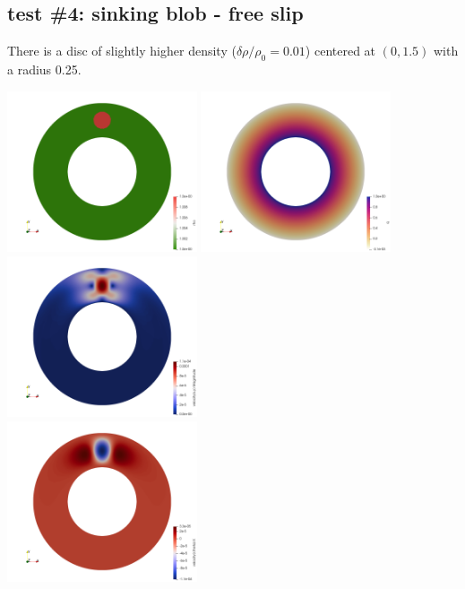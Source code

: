 \subsection*{test \#4: sinking blob - free slip}

There is a disc of slightly higher density ($\delta \rho/\rho_0=0.01$)
centered at $(0,1.5)$  with a radius 0.25. 

\begin{center}
\includegraphics[width=5.6cm]{python_codes/fieldstone_151/results/test5/rho}
\includegraphics[width=5.6cm]{python_codes/fieldstone_151/results/test5/press}
\includegraphics[width=5.6cm]{python_codes/fieldstone_151/results/test5/vel}\\
\includegraphics[width=5.6cm]{python_codes/fieldstone_151/results/test5/vr}

\end{center}
